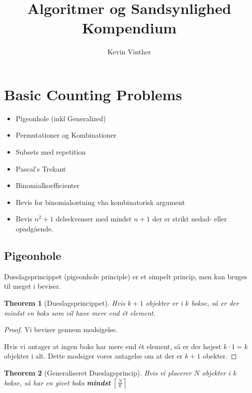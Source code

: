 \documentclass[11pt]{article}
\title{Algoritmer og Sandsynlighed \\ \large Kompendium}
\author{Kevin Vinther}
\newtheorem{theorem}{Theorem}
\theoremstyle{definition}
\theoremstyle{remark}
\begin{document}
\maketitle
\tableofcontents

\newpage


\section{Basic Counting Problems}
\label{sec:basiccounting}

\begin{itemize}
\item Pigeonhole (inkl Generalized)
\item Permutationer og Kombinationer
\item Subsets med repetition
\item Pascal's Trekant
\item Binomialkoefficienter
\item Bevis for binomialsætning vha kombinatorisk argument
\item Bevis $n^{2} + 1$ delsekvenser med mindst $n+1$ der er strikt nedad- eller opadgående. 
\end{itemize}

\subsection{Pigeonhole}
\label{subsec:pigeonhole}

Dueslagsprincippet (pigeonhole principle) er et simpelt princip, men kan bruges til meget i beviser.

\begin{theorem}[Dueslagsprincippet]
\label{theorem:pigeonhole}
Hvis $k+1$ objekter er i $k$ bokse, så er der mindst en boks som vil have mere end ét element. 
\end{theorem}

\begin{proof}
  Vi beviser gennem modsigelse.

  Hvis vi antager at ingen boks har mere end ét element, så er der højest $k \cdot 1 = k$ objekter i alt. Dette modsiger vores antagelse om at der er $k+1$ obekter.
  \end{proof}

\begin{theorem}[Generaliseret Dueslagsprincip]
  Hvis vi placerer $N$ objekter i $k$ bokse, så har en givet boks \textbf{mindst} $\left \lceil \frac{N}{k} \right \rceil $
\end{theorem}
\end{document}
